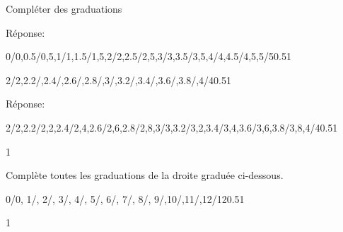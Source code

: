 \documentclass[a4paper,11pt]{report}
\begin{document}
\begin{resolu}{Compléter des graduations}
{\begin{tasks}
Réponse:
\begin{center}
	\begin{numberlined}{0}{5}{1}{1}{0/0,0.5/{0,5},1/1,1.5/{1,5},2/2,2.5/{2,5},3/3,3.5/{3,5},4/4,4.5/{4,5},5/5}{0.5}{1}{}
\end{numberlined}
\end{center}
\task \begin{center}
	\begin{numberlined}{2}{4}{1}{1}{2/2,2.2/,2.4/,2.6/,2.8/,3/,3.2/,3.4/,3.6/,3.8/,4/4}{0.5}{1}{}
\end{numberlined}
\end{center}

Réponse:
\begin{center}
	\begin{numberlined}{2}{4}{1}{1}{2/2,2.2/{2,2},2.4/{2,4},2.6/{2,6},2.8/{2,8},3/3,3.2/{3,2},3.4/{3,4},3.6/{3,6},3.8/{3,8},4/4}{0.5}{1}{}
	\end{numberlined}
\end{center}
\end{tasks}
}{1}
\end{resolu}

\begin{exop}{
Complète toutes les graduations de la droite graduée ci-dessous.
\begin{center}
	\begin{numberlined}{0}{12}{1}{1}{0/0, 1/, 2/, 3/, 4/, 5/, 6/, 7/, 8/, 9/,10/,11/,12/12}{0.5}{1}{}
\end{numberlined}
\end{center}
}{1}\end{exop}
\end{document}
